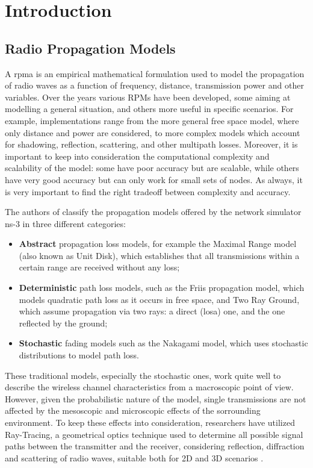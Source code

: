
\chapter{Introduction}
	\section{Radio Propagation Models}
		A \gls{rpma} is an empirical mathematical formulation used to model the propagation of radio waves as a function of frequency, distance, transmission power and other variables. Over the years various RPMs have been developed, some aiming at modelling a general situation, and others more useful in specific scenarios. For example, implementations range from the more general free space model, where only distance and power are considered, to more complex models which account for shadowing, reflection, scattering, and other multipath losses. Moreover, it is important to keep into consideration the computational complexity and scalability of the model: some have poor accuracy but are scalable, while others have very good accuracy but can only work for small sets of nodes. As always, it is very important to find the right tradeoff between complexity and accuracy.
		
		
		The authors of \cite{6298165} classify the propagation models offered by the network simulator ns-3 in three different categories:
		\begin{itemize}
			\item \textbf{Abstract} propagation loss models, for example the Maximal Range model (also known as Unit Disk), which establishes that all transmissions within a certain range are received without any loss;
			\item \textbf{Deterministic} path loss models, such as the Friis propagation model, which models quadratic path loss as it occurs in free space, and Two Ray Ground, which assume propagation via two rays: a direct (\acrshort{losa}) one, and the one reflected by the ground;
			\item \textbf{Stochastic} fading models such as the Nakagami model, which uses stochastic distributions to model path loss.
		\end{itemize}
	
	
		These traditional models, especially the stochastic ones, work quite well to describe the wireless channel characteristics from a macroscopic point of view. However, given the probabilistic nature of the model, single transmissions are not affected by the mesoscopic and microscopic effects of the sorrounding environment. To keep these effects into consideration, researchers have utilized Ray-Tracing, a geometrical optics technique used to determine all possible signal paths between the transmitter and the receiver, considering reflection, diffraction and scattering of radio waves, suitable both for 2D and 3D scenarios \cite{245274} \cite{765022}.
		
